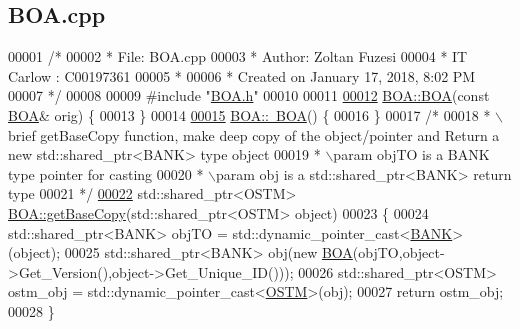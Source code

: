 \hypertarget{_b_o_a_8cpp_source}{}\subsection{B\+O\+A.\+cpp}

\begin{DoxyCode}
00001 \textcolor{comment}{/* }
00002 \textcolor{comment}{ * File:   BOA.cpp}
00003 \textcolor{comment}{ * Author: Zoltan Fuzesi}
00004 \textcolor{comment}{ * IT Carlow : C00197361}
00005 \textcolor{comment}{ *}
00006 \textcolor{comment}{ * Created on January 17, 2018, 8:02 PM}
00007 \textcolor{comment}{ */}
00008 
00009 \textcolor{preprocessor}{#include "\hyperlink{_b_o_a_8h}{BOA.h}"}
00010 
00011 
\hypertarget{_b_o_a_8cpp_source.tex_l00012}{}\hyperlink{class_b_o_a_a99ebf22a8d824761dc82e7e191e6f173_a99ebf22a8d824761dc82e7e191e6f173}{00012} \hyperlink{class_b_o_a_ad42dc670d422172c9bcf9b3d354c8a3c_ad42dc670d422172c9bcf9b3d354c8a3c}{BOA::BOA}(\textcolor{keyword}{const} \hyperlink{class_b_o_a}{BOA}& orig) \{
00013 \}
00014 
\hypertarget{_b_o_a_8cpp_source.tex_l00015}{}\hyperlink{class_b_o_a_abe27b17a23ceffc6269dbe6d81de5212_abe27b17a23ceffc6269dbe6d81de5212}{00015} \hyperlink{class_b_o_a_abe27b17a23ceffc6269dbe6d81de5212_abe27b17a23ceffc6269dbe6d81de5212}{BOA::~BOA}() \{
00016 \}
00017 \textcolor{comment}{/*}
00018 \textcolor{comment}{ * \(\backslash\)brief getBaseCopy function, make deep copy of the object/pointer and Return a new std::shared\_ptr<BANK>
       type object}
00019 \textcolor{comment}{ * \(\backslash\)param objTO is a BANK type pointer for casting}
00020 \textcolor{comment}{ * \(\backslash\)param obj is a std::shared\_ptr<BANK> return type}
00021 \textcolor{comment}{ */}
\hypertarget{_b_o_a_8cpp_source.tex_l00022}{}\hyperlink{class_b_o_a_a46ace5d3c945a423e93912673cadfad5_a46ace5d3c945a423e93912673cadfad5}{00022} std::shared\_ptr<OSTM> \hyperlink{class_b_o_a_a46ace5d3c945a423e93912673cadfad5_a46ace5d3c945a423e93912673cadfad5}{BOA::getBaseCopy}(std::shared\_ptr<OSTM> \textcolor{keywordtype}{object})
00023 \{
00024         std::shared\_ptr<BANK> objTO = std::dynamic\_pointer\_cast<\hyperlink{class_b_a_n_k}{BANK}>(object);
00025     std::shared\_ptr<BANK> obj(\textcolor{keyword}{new} \hyperlink{class_b_o_a_ad42dc670d422172c9bcf9b3d354c8a3c_ad42dc670d422172c9bcf9b3d354c8a3c}{BOA}(objTO,object->Get\_Version(),\textcolor{keywordtype}{object}->Get\_Unique\_ID())); 
00026         std::shared\_ptr<OSTM> ostm\_obj = std::dynamic\_pointer\_cast<\hyperlink{class_o_s_t_m}{OSTM}>(obj);
00027     \textcolor{keywordflow}{return} ostm\_obj;
00028 \}

\end{DoxyCode}
